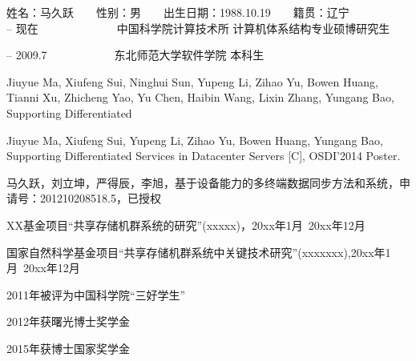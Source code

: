 \begin{resume}

\noindent
姓名：马久跃　　性别：男　　出生日期：1988.10.19　　籍贯：辽宁\\

 -- 现在　　　　　　　中国科学院计算技术所 计算机体系结构专业硕博研究生

 -- 2009.7　　　　　　东北师范大学软件学院 本科生\\

  \begin{enumerate}[leftmargin=1.5\parindent, nolistsep, label={[\arabic*]}]
    \item Jiuyue Ma, Xiufeng Sui, Ninghui Sun, Yupeng Li, Zihao Yu, Bowen Huang, Tianni Xu, Zhicheng Yao, Yu Chen, Haibin Wang, Lixin Zhang, Yungang Bao, Supporting Differentiated
    \item Jiuyue Ma, Xiufeng Sui, Yupeng Li, Zihao Yu, Bowen Huang, Yungang Bao, Supporting Differentiated Services in Datacenter Servers [C], OSDI'2014 Poster.
  \end{enumerate}

  \begin{enumerate}[leftmargin=1.5\parindent, nolistsep, label={[\arabic*]}]
    \item 马久跃，刘立坤，严得辰，李旭，基于设备能力的多终端数据同步方法和系统，申请号：201210208518.5，已授权
  \end{enumerate}

  \begin{enumerate}[leftmargin=1.5\parindent, nolistsep, label={[\arabic*]}]
    \item XX基金项目“共享存储机群系统的研究”(xxxxx)，20xx年1月~20xx年12月
    \item 国家自然科学基金项目“共享存储机群系统中关键技术研究”(xxxxxxx),20xx年1月~20xx年12月
  \end{enumerate}

  \begin{enumerate}[leftmargin=1.5\parindent, nolistsep, label={[\arabic*]}]
    \item 2011年被评为中国科学院``三好学生''
    \item 2012年获曙光博士奖学金
    \item 2015年获博士国家奖学金
  \end{enumerate}
\end{resume}
